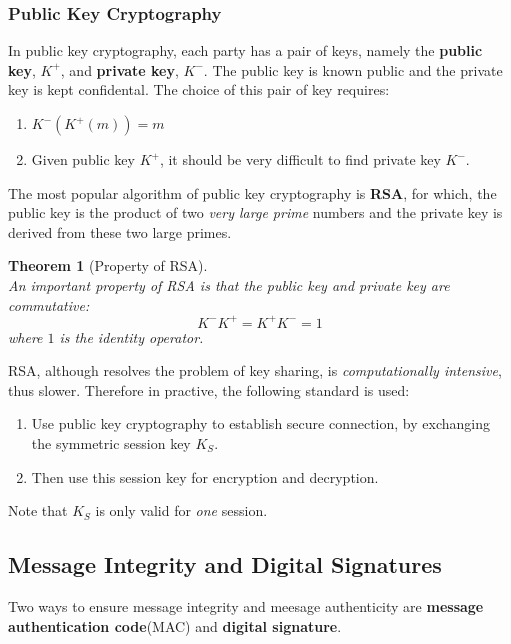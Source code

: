 \documentclass[12pt]{article}
\newtheorem{theorem}{Theorem}[section]
\theoremstyle{definition}
\begin{document}
\subsubsection{Public Key Cryptography}
In public key cryptography, each party has a pair of keys, namely the \textbf{public key}, $K^+$, and \textbf{private key}, $K^-$. The public key is known public and the private key is kept confidental. The choice of this pair of key requires:
\begin{enumerate}
  \item $K^-(K^+(m))=m$
  \item Given public key $K^+$, it should be very difficult to find private key $K^-$.
\end{enumerate}
The most popular algorithm of public key cryptography is \textbf{RSA}, for which, the public key is the product of two \textit{very large prime} numbers and the private key is derived from these two large primes.
\begin{theorem}[Property of RSA]
\hfill\\\normalfont An important property of RSA is that the public key and private key are commutative:
\[
K^-K^+=K^+K^-=1
\]
where $1$ is the identity operator.
\end{theorem}
RSA, although resolves the problem of key sharing, is \textit{computationally intensive}, thus slower. Therefore in practive, the following standard is used:
\begin{enumerate}
  \item Use public key cryptography to establish secure connection, by exchanging the symmetric session key $K_S$.
  \item Then use this session key for encryption and decryption.
\end{enumerate}
Note that $K_S$ is only valid for \textit{one} session.
\subsection{Message Integrity and Digital Signatures}
Two ways to ensure message integrity and meesage authenticity are \textbf{message authentication code}(MAC) and \textbf{digital signature}.
\end{document}
